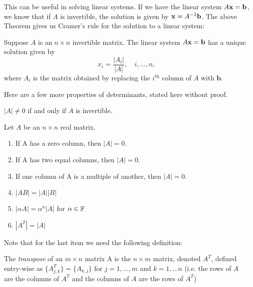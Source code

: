 \documentclass{article}
\begin{document}
This can be useful in solving linear systems. If we have the linear system $A{\mathbf{x}} = \mathbf{b}$, we know that if $A$ is invertible, the solution is given by ${\mathbf{x}} = A^{-1} \mathbf{b}$. The above Theorem gives us Cramer's rule for the solution to a linear system:
\begin{corollary}
Suppose $A$ is an $n \times n$ invertible matrix. The linear system $A{\mathbf{x}} = \mathbf{b}$ has a unique solution given by
\begin{equation*}
    x_i = \frac{|A_i|}{|A|}, \quad i, \ldots, n,
\end{equation*}
where $A_i$ is the matrix obtained by replacing the $i^\text{th}$ column of $A$ with $\mathbf{b}$.
\end{corollary}

Here are a few more properties of determinants, stated here without proof.

\begin{proposition}
\label{prop:A_invertible}
$|A| \neq 0$ if and only if $A$ is invertible.
\end{proposition}

\begin{proposition}
Let $A$ be an $n \times n$ real matrix.
\begin{enumerate}
    \item If A has a zero column, then $|A| = 0$.
\item If A has two equal columns, then $|A| = 0$.
\item If one column of A is a multiple of another, then $|A| = 0$.
\item $|AB| = |A| |B|$
\item $|\alpha A| = \alpha^n |A|$ for $\alpha \in {\mathbb{F}}$
\item $|A^T| = |A|$
\end{enumerate}
\end{proposition}

Note that for the last item we need the following definition:

\begin{definition}
The \emph{transpose} of an $m \times n$ matrix A is the $n \times m$ matrix, denoted $A^T$, defined entry-wise as $\{A^T_{j,k}\} = \{A_{k,j}\}$ for $j=1,\ldots,m$ and $k=1,\ldots n$ (i.e. the rows of $A$ are the columns of $A^T$ and the columns of $A$ are the rows of $A^T$)
\end{definition}
\end{document}
